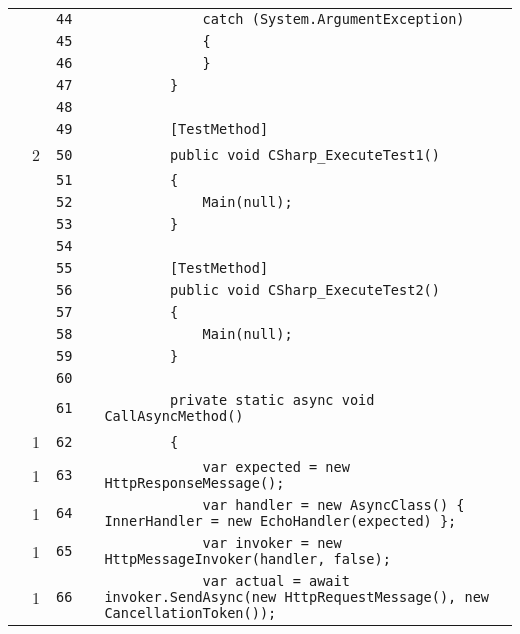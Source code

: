 \documentclass[a4paper,landscape,10pt]{article}
\begin{document}
\begin{longtable}[l]{lrrll}
\cellcolor{gray} &  & \verb~44~ & & \verb~            catch (System.ArgumentException)~\\
\cellcolor{gray} &  & \verb~45~ & & \verb~            {~\\
\cellcolor{gray} &  & \verb~46~ & & \verb~            }~\\
\cellcolor{gray} &  & \verb~47~ & & \verb~        }~\\
\cellcolor{gray} &  & \verb~48~ & & \verb~~\\
\cellcolor{gray} &  & \verb~49~ & & \verb~        [TestMethod]~\\
\cellcolor{green} & 2 & \verb~50~ & & \verb~        public void CSharp_ExecuteTest1()~\\
\cellcolor{gray} &  & \verb~51~ & & \verb~        {~\\
\cellcolor{gray} &  & \verb~52~ & & \verb~            Main(null);~\\
\cellcolor{gray} &  & \verb~53~ & & \verb~        }~\\
\cellcolor{gray} &  & \verb~54~ & & \verb~~\\
\cellcolor{gray} &  & \verb~55~ & & \verb~        [TestMethod]~\\
\cellcolor{gray} &  & \verb~56~ & & \verb~        public void CSharp_ExecuteTest2()~\\
\cellcolor{gray} &  & \verb~57~ & & \verb~        {~\\
\cellcolor{gray} &  & \verb~58~ & & \verb~            Main(null);~\\
\cellcolor{gray} &  & \verb~59~ & & \verb~        }~\\
\cellcolor{gray} &  & \verb~60~ & & \verb~~\\
\cellcolor{gray} &  & \verb~61~ & & \verb~        private static async void CallAsyncMethod()~\\
\cellcolor{green} & 1 & \verb~62~ & & \verb~        {~\\
\cellcolor{green} & 1 & \verb~63~ & & \verb~            var expected = new HttpResponseMessage();~\\
\cellcolor{green} & 1 & \verb~64~ & & \verb~            var handler = new AsyncClass() { InnerHandler = new EchoHandler(expected) };~\\
\cellcolor{green} & 1 & \verb~65~ & & \verb~            var invoker = new HttpMessageInvoker(handler, false);~\\
\cellcolor{green} & 1 & \verb~66~ & & \verb~            var actual = await invoker.SendAsync(new HttpRequestMessage(), new CancellationToken());~\\

\end{longtable}
\end{document}
